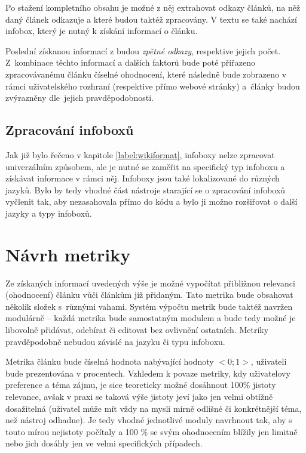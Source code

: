Po stažení kompletního obsahu je možné z něj extrahovat odkazy článků, na něž daný článek odkazuje a které budou taktéž zpracovány. V textu se také nachází infobox, který je nutný k získání informací o článku.

Poslední získanou informací z  budou \textit{zpětné odkazy}, respektive jejich počet. Z~kombinace těchto informací a dalších faktorů bude poté přiřazeno zpracovávanému článku číselné ohodnocení, které následně bude zobrazeno v rámci uživatelského rozhraní (respektive přímo webové stránky) a~články budou zvýrazněny dle~jejich pravděpodobnosti.

\subsection{Zpracování infoboxů}
Jak již bylo řečeno v kapitole \ref{label:wikiformat}, infoboxy nelze zpracovat univerzálním způsobem, ale je nutné se zaměřit na specifický typ infoboxu a získávat informace v rámci něj. Infoboxy jsou také lokalizované do různých jazyků. Bylo by tedy vhodné část nástroje starající se o zpracování infoboxů vyčlenit tak, aby nezasahovala přímo do kódu a bylo ji možno rozšiřovat o další jazyky a typy infoboxů.

\section{Návrh metriky}
Ze získaných informací uvedených výše je možné vypočítat přibližnou relevanci (ohodnocení) článku vůči článkům již přidaným. Tato metrika bude obsahovat několik složek s~různými vahami. Systém výpočtu metrik bude taktéž navržen modulárně -- každá metrika bude samostatným modulem a bude tedy možné je libovolně přidávat, odebírat či editovat bez ovlivnění ostatních. Metriky pravděpodobně nebudou závislé na jazyku či typu infoboxu.

Metrika článku bude číselná hodnota nabývající hodnoty $<0; 1>$, uživateli bude prezentována v procentech. Vzhledem k povaze metriky, kdy  uživatelovy preference a téma zájmu, je sice teoreticky možné dosáhnout 100\% jistoty relevance, avšak v praxi se taková výše jistoty jeví jako jen velmi obtížně dosažitelná (uživatel může mít vždy na mysli mírně odlišné či konkrétnější téma, než nástroj odhadne). Je tedy vhodné jednotlivé moduly navrhnout tak, aby s touto mírou nejistoty počítaly a 100 \% se svým ohodnocením blížily jen limitně nebo jich dosáhly jen ve velmi specifických případech.

